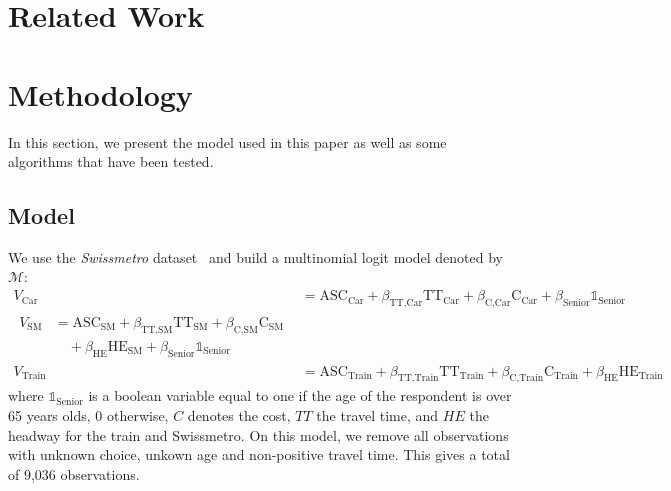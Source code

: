 \documentclass[conference]{IEEEtran}
\begin{document}
\section{Related Work}


\section{Methodology}

In this section, we present the model used in this paper as well as some algorithms that have been tested.

\subsection{Model}

We use the {\it Swissmetro} dataset~\cite{bierlaire_acceptance_2001} and build a multinomial logit model denoted by $\mathcal{M}$:
\begin{align}
V_{\text{Car}} &= \text{ASC}_{\text{Car}} + \beta_{\text{TT,Car}} \text{TT}_{\text{Car}} + \beta_{\text{C,Car}} \text{C}_{\text{Car}} + \beta_{\text{Senior}}\mathbb{1}_{\text{Senior}} \nonumber \\
\begin{split}
V_{\text{SM}} &= \text{ASC}_{\text{SM}} + \beta_{\text{TT,SM}} \text{TT}_{\text{SM}} + \beta_{\text{C,SM}} \text{C}_{\text{SM}} \\
& \quad + \beta_{\text{HE}} \text{HE}_{\text{SM}} + \beta_{\text{Senior}}\mathbb{1}_{\text{Senior}}
\end{split} \\
V_{\text{Train}} &= \text{ASC}_{\text{Train}} + \beta_{\text{TT,Train}} \text{TT}_{\text{Train}} + \beta_{\text{C,Train}} \text{C}_{\text{Train}} + \beta_{\text{HE}} \text{HE}_{\text{Train}} \nonumber
\end{align}
where $\mathbb{1}_{\text{Senior}}$ is a boolean variable equal to one if the age of the respondent is over 65 years olds, 0 otherwise, $C$ denotes the cost, $TT$ the travel time, and $HE$ the headway for the train and Swissmetro. On this model, we remove all observations with unknown choice, unkown age and non-positive travel time. This gives a total of 9,036 observations.\\
 
\end{document}
